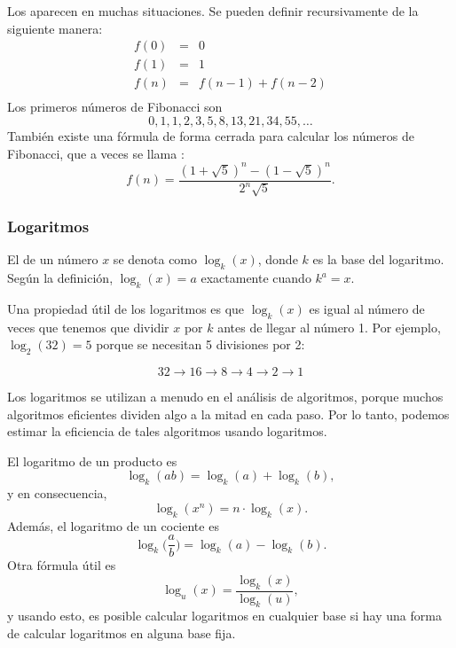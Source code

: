 
Los 
aparecen en muchas situaciones.
Se pueden definir recursivamente de la siguiente manera:
\[
    \begin{array}{lcl}
        f(0) & = & 0             \\
        f(1) & = & 1             \\
        f(n) & = & f(n-1)+f(n-2) \\
    \end{array}
\]
Los primeros números de Fibonacci son
\[0, 1, 1, 2, 3, 5, 8, 13, 21, 34, 55, \ldots\]
También existe una fórmula de forma cerrada
para calcular los números de Fibonacci, que a veces se llama
:
\[f(n)=\frac{(1 + \sqrt{5})^n - (1-\sqrt{5})^n}{2^n \sqrt{5}}.\]

\subsubsection{Logaritmos}


El  de un número $x$
se denota como $\log_k(x)$, donde $k$ es la base
del logaritmo.
Según la definición,
$\log_k(x)=a$ exactamente cuando $k^a=x$.

Una propiedad útil de los logaritmos es
que $\log_k(x)$ es igual al número de veces
que tenemos que dividir $x$ por $k$ antes de llegar
al número 1.
Por ejemplo, $\log_2(32)=5$
porque se necesitan 5 divisiones por 2:

\[32 \rightarrow 16 \rightarrow 8 \rightarrow 4 \rightarrow 2 \rightarrow 1 \]

Los logaritmos se utilizan a menudo en el análisis de
algoritmos, porque muchos algoritmos eficientes
dividen algo a la mitad en cada paso.
Por lo tanto, podemos estimar la eficiencia de tales algoritmos
usando logaritmos.

El logaritmo de un producto es
\[\log_k(ab) = \log_k(a)+\log_k(b),\]
y en consecuencia,
\[\log_k(x^n) = n \cdot \log_k(x).\]
Además, el logaritmo de un cociente es
\[\log_k\Big(\frac{a}{b}\Big) = \log_k(a)-\log_k(b).\]
Otra fórmula útil es
\[\log_u(x) = \frac{\log_k(x)}{\log_k(u)},\]
y usando esto, es posible calcular
logaritmos en cualquier base si hay una forma de
calcular logaritmos en alguna base fija.


